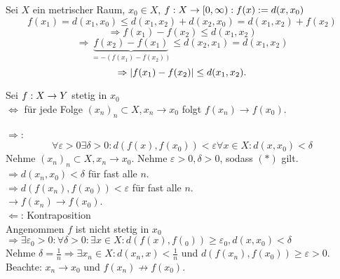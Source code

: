\documentclass[../ana2.tex]{subfiles}
\begin{document}
\begin{bsp}
    Sei \(X\) ein metrischer Raum, \(x_0 \in X\),
    \( f:X\rightarrow [0, \infty): f(x) := d(x,x_0) \)
    \[ f(x_1) = d(x_1, x_0) \leq d(x_1, x_2) + d(x_2, x_0)
    = d(x_1, x_2) + f(x_2) \]
    \[ \Rightarrow f(x_1) - f(x_2) \leq d(x_1, x_2) \]
    \[ \Rightarrow \underbrace{f(x_2) - f(x_1)}_{
        = -(f(x_1) - f(x_2))
    } \leq d(x_2, x_1) = d(x_1, x_2) \]
    \[ \Rightarrow \left| f(x_1) - f(x_2) \right| 
    \leq d(x_1, x_2). \]
\end{bsp}
\begin{defi}
    Sei \( f:X\rightarrow Y \) stetig in \(x_0\)\\
    \( \Leftrightarrow \) für jede Folge 
    \( (x_n)_n \subset X, x_n \rightarrow x_0 \) 
    folgt \( f(x_n) \rightarrow f(x_0) \).
\end{defi}
\begin{bew}
    \( \Rightarrow \): 
    \[ \forall \varepsilon >0
    \exists \delta >0: d(f(x), f(x_0)) < \varepsilon
    \forall x \in X: d(x, x_0) < \delta \tag{\(*\)} \]
    Nehme \( (x_n)_n \subset X, x_n \rightarrow x_0 \).
    Nehme \( \varepsilon > 0, \delta > 0 \), sodass 
    \((*)\) gilt.
    \( \Rightarrow d(x_n, x_0) < \delta \) für fast 
    alle \(n\).\\
    \( \Rightarrow d(f(x_n), f(x_0)) < \varepsilon \) 
    für fast alle \(n\).\\
    \( \rightarrow f(x_n) \rightarrow f(x_0) \). \\
    \( \Leftarrow \): Kontraposition \\
    Angenommen \(f\) ist nicht stetig in \(x_0\)
    \( \Rightarrow \exists \varepsilon_0 > 0: 
    \forall \delta >0: \exists x\in X: 
    d(f(x),f(_0)) \geq \varepsilon_0, d(x,x_0) < \delta \) \\
    Nehme \( \delta = \frac{1}{n} \Rightarrow \exists 
    x_n \in X: d(x_n, x) < \frac{1}{n} \) und 
    \( d(f(x_n), f(x_0)) \geq \varepsilon > 0 \).
    Beachte: \(x_n \rightarrow x_0\) und 
    \(f(x_n) \not \rightarrow f(x_0) \).
\end{bew}
\end{document}
